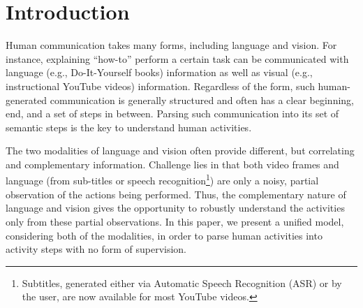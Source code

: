 
\section{Introduction}
Human communication takes many forms, including language and vision. For instance, explaining ``how-to'' perform a certain task can be communicated with language (e.g., Do-It-Yourself books) information as well as visual (e.g., instructional YouTube videos) information. Regardless of the form, such human-generated communication is generally structured and often has a clear beginning, end, and a set of steps in between. Parsing such communication into its set of semantic steps is the key to understand human activities. 




%
The two modalities of language and vision often provide different, but correlating and complementary information. Challenge lies in that both video frames and language (from sub-titles or speech recognition\footnote{Subtitles, generated either via Automatic Speech Recognition (ASR) or by the user, are now available for most YouTube videos.}) are only a noisy, partial observation of the actions being performed. Thus, the complementary nature of language and vision gives the opportunity to robustly understand the activities only from these partial observations. In this paper, we present a unified model, considering both of the modalities, in order to parse human activities into activity steps with no form of supervision.




